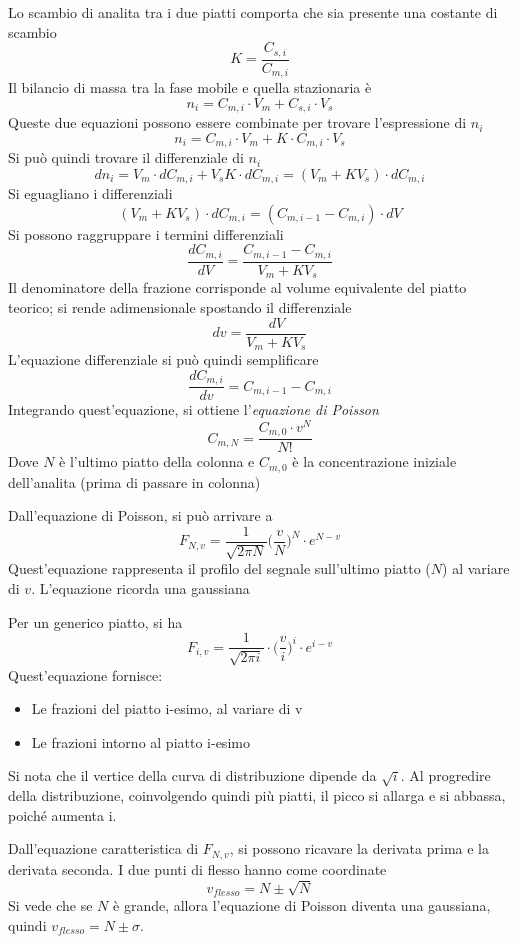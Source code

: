 Lo scambio di analita tra i due piatti comporta che sia presente una costante di scambio
\[
K = \frac{C_{s,i}}{C_{m,i}}
\]
Il bilancio di massa tra la fase mobile e quella stazionaria è
\[
n_i = C_{m,i} \cdot V_m + C_{s,i} \cdot V_s
\]
Queste due equazioni possono essere combinate per trovare l'espressione di $n_i$
\[
n_i = C_{m,i} \cdot V_m + K \cdot C_{m,i} \cdot V_s
\]
Si può quindi trovare il differenziale di $n_i$
\[
dn_i = V_m \cdot d C_{m,i} + V_s K \cdot d C_{m,i} = (V_m + K V_s) \cdot d C_{m,i}
\]
Si eguagliano i differenziali
\[
(V_m + K V_s) \cdot d C_{m,i} = (C_{m,i-1} - C_{m,i}) \cdot dV
\]
Si possono raggruppare i termini differenziali
\[
\frac{d C_{m,i}}{dV} = \frac{C_{m,i-1} - C_{m,i}}{V_m + K V_s}
\]
Il denominatore della frazione corrisponde al volume equivalente del piatto teorico; si rende adimensionale spostando il differenziale
\[
dv = \frac{dV}{V_m + K V_s}
\]
L'equazione differenziale si può quindi semplificare
\[
\frac{d C_{m,i}}{dv} = C_{m,i-1} - C_{m,i}
\]
Integrando quest'equazione, si ottiene l'\emph{equazione di Poisson}
\[
C_{m,N} = \frac{C_{m,0} \cdot v^N}{N!}
\]
Dove $N$ è l'ultimo piatto della colonna e $C_{m,0}$ è la concentrazione iniziale dell'analita (prima di passare in colonna)

Dall'equazione di Poisson, si può arrivare a
\[
F_{N,v} = \frac{1}{\sqrt{2 \pi N}} \biggl(\frac{v}{N}\biggr)^N \cdot e^{N-v}
\]
Quest'equazione rappresenta il profilo del segnale sull'ultimo piatto ($N$) al variare di $v$. L'equazione ricorda una gaussiana


Per un generico piatto, si ha
\[
F_{i,v} = \frac{1}{\sqrt{2 \pi i}} \cdot \biggl(\frac{v}{i}\biggr)^i \cdot e^{i-v}
\]
Quest'equazione fornisce:
\begin{itemize}
\item Le frazioni del piatto i-esimo, al variare di v
\item Le frazioni intorno al piatto i-esimo
\end{itemize}
Si nota che il vertice della curva di distribuzione dipende da $\sqrt{i}$.
Al progredire della distribuzione, coinvolgendo quindi più piatti, il picco si allarga e si abbassa, poiché aumenta i.

Dall'equazione caratteristica di $F_{N,v}$, si possono ricavare la derivata prima e la derivata seconda. I due punti di flesso hanno come coordinate
\[
v_{flesso} = N \pm \sqrt{N}
\]
Si vede che se $N$ è grande, allora l'equazione di Poisson diventa una gaussiana, quindi $v_{flesso} = N \pm \sigma$.

